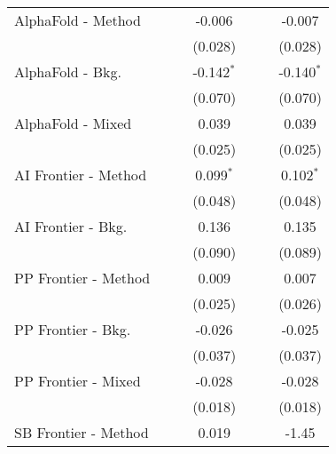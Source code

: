 \begin{tabular}{lcccccc}
   AlphaFold - Method           &              &         & -0.006       &              &             & -0.007\\   
                                &              &         & (0.028)      &              &             & (0.028)\\   
   AlphaFold - Bkg.             &              &         & -0.142$^{*}$ &              &             & -0.140$^{*}$\\   
                                &              &         & (0.070)      &              &             & (0.070)\\   
   AlphaFold - Mixed            &              &         & 0.039        &              &             & 0.039\\   
                                &              &         & (0.025)      &              &             & (0.025)\\   
   AI Frontier - Method         &              &         & 0.099$^{*}$  &              &             & 0.102$^{*}$\\   
                                &              &         & (0.048)      &              &             & (0.048)\\   
   AI Frontier - Bkg.           &              &         & 0.136        &              &             & 0.135\\   
                                &              &         & (0.090)      &              &             & (0.089)\\   
   PP Frontier - Method         &              &         & 0.009        &              &             & 0.007\\   
                                &              &         & (0.025)      &              &             & (0.026)\\   
   PP Frontier - Bkg.           &              &         & -0.026       &              &             & -0.025\\   
                                &              &         & (0.037)      &              &             & (0.037)\\   
   PP Frontier - Mixed          &              &         & -0.028       &              &             & -0.028\\   
                                &              &         & (0.018)      &              &             & (0.018)\\   
   SB Frontier - Method         &              &         & 0.019        &              &             & -1.45\\   

\end{tabular}
